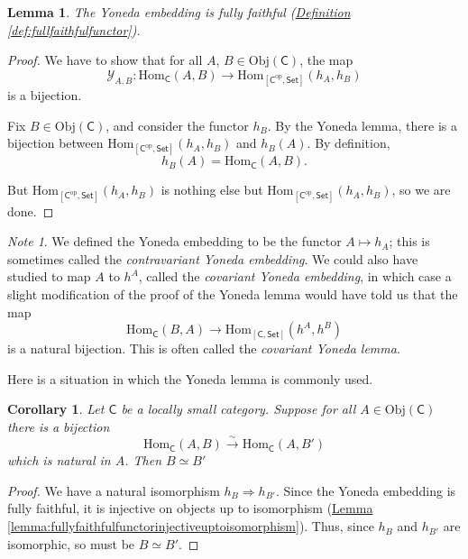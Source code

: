\documentclass[a4paper,10pt]{scrreprt}
\newcommand{\Obj}{\mathrm{Obj}}
\newcommand{\Hom}{\mathrm{Hom}}
\theoremstyle{definition}
\theoremstyle{plain}
\newtheorem{lemma}{Lemma}[section]
\newtheorem{corollary}{Corollary}[section]
\theoremstyle{remark}
\newtheorem{note}{Note}[section]
\begin{document}
\begin{lemma}
  The Yoneda embedding is fully faithful (\hyperref[def:fullfaithfulfunctor]{Definition \ref*{def:fullfaithfulfunctor}}).
\end{lemma}
\begin{proof}
  We have to show that for all $A$, $B \in \Obj(\mathsf{C})$, the map
  \begin{equation*}
    \mathcal{Y}_{A, B}\colon \Hom_{\mathsf{C}}(A, B) \to \Hom_{[\mathsf{C}^{\mathrm{op}}, \mathsf{Set}]}(h_{A}, h_{B})
  \end{equation*}
  is a bijection.

  Fix $B \in \Obj(\mathsf{C})$, and consider the functor $h_{B}$. By the Yoneda lemma, there is a bijection between $\Hom_{[\mathsf{C}^{\text{op}}, \mathsf{Set}]}(h_{A}, h_{B})$ and $h_{B}(A)$. By definition,
  \begin{equation*}
    h_{B}(A) = \Hom_{\mathsf{C}}(A, B).
  \end{equation*}

  But $\Hom_{[\mathsf{C}^{\text{op}}, \mathsf{Set}]}(h_{A}, h_{B})$ is nothing else but $\Hom_{[\mathsf{C}^{\mathrm{op}}, \mathsf{Set}]}(h_{A}, h_{B})$, so we are done.
\end{proof}

\begin{note}
  \label{note:covariantyonedaembedding}
  We defined the Yoneda embedding to be the functor $A \mapsto h_{A}$; this is sometimes called the \emph{contravariant Yoneda embedding}. We could also have studied to map $A$ to $h^{A}$, called the \emph{covariant Yoneda embedding}, in which case a slight modification of the proof of the Yoneda lemma would have told us that the map
  \begin{equation*}
    \Hom_{\mathsf{C}}(B, A) \to \Hom_{[\mathsf{C}, \mathsf{Set}]}(h^{A}, h^{B})
  \end{equation*}
  is a natural bijection. This is often called the \emph{covariant Yoneda lemma}.
\end{note}

Here is a situation in which the Yoneda lemma is commonly used.
\begin{corollary}
  \label{cor:yonedaembeddingrespectsisomorphisms}
  Let $\mathsf{C}$ be a locally small category. Suppose for all $A \in \Obj(\mathsf{C})$ there is a bijection
  \begin{equation*}
    \Hom_{\mathsf{C}}(A, B) \stackrel{\sim}{\to} \Hom_{\mathsf{C}}(A, B')
  \end{equation*}
  which is natural in $A$. Then $B \simeq B'$
\end{corollary}
\begin{proof}
  We have a natural isomorphism $h_{B} \Rightarrow h_{B'}$. Since the Yoneda embedding is fully faithful, it is injective on objects up to isomorphism (\hyperref[lemma:fullyfaithfulfunctorinjectiveuptoisomorphism]{Lemma \ref*{lemma:fullyfaithfulfunctorinjectiveuptoisomorphism}}). Thus, since $h_{B}$ and $h_{B'}$ are isomorphic, so must be $B \simeq B'$.
\end{proof}
\end{document}
